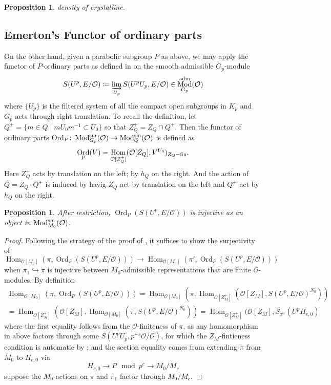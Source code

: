 \documentclass[leqno]{amsart}
\DeclareMathOperator{\Mod}{\textnormal{Mod}}
\DeclareMathOperator{\Ord}{Ord}
\newcommand{\sm}{\textnormal{sm}}
\newcommand{\adm}{\textnormal{adm}}
\newcommand{\fin}{\textnormal{fin}}
\newcommand{\oo}{\mathcal{O}} %
\DeclareMathOperator{\Hom}{Hom}
\newtheorem{prop}[thm]{Proposition}
\theoremstyle{definition}
\theoremstyle{remark}
\begin{document}
\begin{prop}
	density of crystalline.
\end{prop}



\subsection{Emerton's Functor of ordinary parts}

On the other hand,
given a parabolic subgroup $P$ as above, 
we may apply 
the functor of $P$-ordinary parts as defined in \cite{emeI}
on the smooth admissible $G_p$-module
\[
	S(U^p,E/\oo)\coloneqq
	\varinjlim_{U_p}S(U^pU_p,E/\oo)\in 
	\Mod^{\adm}_{G_p}(\oo)
\]
where $\{U_p\}$ is the filtered system of 
all the compact open subgroups in $K_p$
and $G_p$ acts through right translation.
To recall the definition,
let $Q^+=\{m\in Q\mid mU_0m^{-1}\subset U_0\}$ 
so that $Z_Q^+=Z_Q\cap Q^+$.
Then the functor of ordinary parts
$ \Ord_P\colon \Mod^{\sm}_{G_p}(\oo)\to \Mod^{\sm}_Q(\oo)$
is defined as
\[
	\Ord_P(V)=\Hom_{\oo[Z_Q^+]}(\oo[Z_Q], V^{U_0})_{Z_Q-\fin}.
\]
Here $Z_Q^+$ acts by translation on the left; by $h_Q$ on the right.
And the action of $Q=Z_Q\cdot Q^+$ is induced by 
havig $Z_Q$ act by translation on the left and 
$Q^+$ act by $h_Q$ on the right.



\begin{prop}
	After restriction, 
	$\Ord_P(S(U^p,E/\oo))$ is injective
	as an object in $\Mod^{\sm}_{M_0}(\oo)$.
\end{prop}
\begin{proof}
	Following the strategy of the proof of 
	\cite[Prop 3.2.4]{pan}, it suffices to show the surjectivity of
	\[
		\Hom_{\oo[M_0]}(\pi,\Ord_P(S(U^p,E/\oo)))\to 
		\Hom_{\oo[M_0]}(\pi',\Ord_P(S(U^p,E/\oo)))
	\]
	when $\pi_{1}\hookrightarrow \pi$ 
	is injective between $M_0$-admissible
	representations that are finite $\oo$-modules.
	By definition
	\begin{multline*}
		\Hom_{\oo[M_0]}(\pi,\Ord_P(S(U^p,E/\oo)))=
		\Hom_{\oo[M_0]}(\pi,
		\Hom_{\oo[Z_M^+]}
		(\oo[Z_M], S(U^p,E/\oo)^{N_0}))\\=
		\Hom_{\oo[Z_M^+]}(\oo[Z_M],
		\Hom_{\oo[M_0]}(\pi, S(U^p,E/\oo)^{N_0}))=
		\Hom_{\oo[Z_M^+]}(\oo[Z_M],
		S_{\pi^\vee}(U^pH_{c,0})
	\end{multline*}
	where the first equality follows from the $\oo$-finiteness of $\pi$,
	as any homomorphism in above factors through some 
	$S(U^pU_p,p^{-s}\oo/\oo)$,
	for which
	the $Z_M$-fintieness condition is automatic
	by \cite[Lem 3.1.5]{emeI};
	and the section equality comes from 
	extending $\pi$ from  $M_0$ to  $H_{c,0}$ via
	\[
		H_{c,0}\to P \mod p^c\to M_0/M_c
	\]
	suppose the $M_0$-actions on  $\pi$ and  $\pi_1$
	factor through  $M_0/M_c$.
\end{proof}
\end{document}
